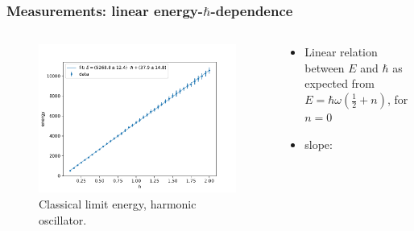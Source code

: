 \documentclass[aspectratio=169]{beamer}
\begin{document}
\begin{frame}
	\frametitle{Measurements: linear energy-$\hbar$-dependence}
	\vspace{-15px}
	\begin{columns}
		\begin{column}{0.6\textwidth}
			\begin{figure}[H]
				\centering
					\includegraphics[width=\textwidth]{../imgs/harmonic_oscillator_classical_limit_energy/harmonic_oscillator_10_classical_limit_energy.pdf}
				\caption{Classical limit energy, harmonic oscillator.}
				\label{fig:harmonic_oscillator_classical_limit_energy}
			\end{figure}
		\end{column}
		\begin{column}{0.39\textwidth}
			\begin{itemize}
				\item Linear relation between $E$ and $\hbar$ as expected from $E = \hbar \omega \left(\frac 12 + n\right)$, for $n = 0$
				\item slope: 
			\end{itemize}
		\end{column}
	\end{columns}
\end{frame}
\end{document}
